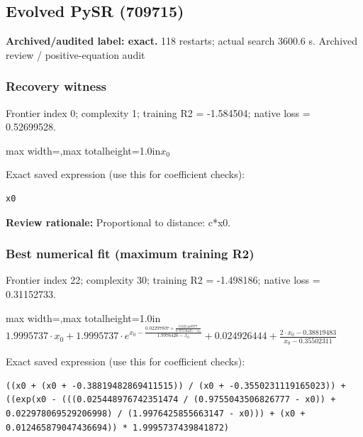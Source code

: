 \documentclass[10pt,letterpaper,landscape]{article}
\begin{document}
\begin{minipage}[t]{0.485\textwidth}
\subsection*{Evolved PySR (709715)}
\textbf{Archived/audited label: exact.} 118 restarts; actual search 3600.6 s.
{\small Archived review / positive-equation audit}
\subsubsection*{Recovery witness}
Frontier index 0; complexity 1; training R2 = -1.584504; native loss = 0.52699528.
\begin{center}\begin{adjustbox}{max width=\linewidth,max totalheight=1.0in}$\displaystyle x_{0}$\end{adjustbox}\end{center}
{\scriptsize Exact saved expression (use this for coefficient checks):}
\begin{lstlisting}
x0
\end{lstlisting}
{\small\textbf{Review rationale:} Proportional to distance: c*x0.}
\subsubsection*{Best numerical fit (maximum training R2)}
Frontier index 22; complexity 30; training R2 = -1.498186; native loss = 0.31152733.
\begin{center}\begin{adjustbox}{max width=\linewidth,max totalheight=1.0in}$\displaystyle 1.9995737 \cdot x_{0} + 1.9995737 \cdot e^{x_{0} - \frac{0.02297807 + \frac{0.025448977}{0.97550435 - x_{0}}}{1.9976426 - x_{0}}} + 0.024926444 + \frac{2 \cdot x_{0} - 0.38819483}{x_{0} - 0.35502311}$\end{adjustbox}\end{center}
{\scriptsize Exact saved expression (use this for coefficient checks):}
\begin{lstlisting}
((x0 + (x0 + -0.38819482869411515)) / (x0 + -0.3550231119165023)) + ((exp(x0 - (((0.025448976742351474 / (0.9755043506826777 - x0)) + 0.022978069529206998) / (1.9976425855663147 - x0))) + (x0 + 0.012465879047436694)) * 1.9995737439841872)
\end{lstlisting}
\end{minipage}
\clearpage{}\label{hubble-10008}
\end{document}
